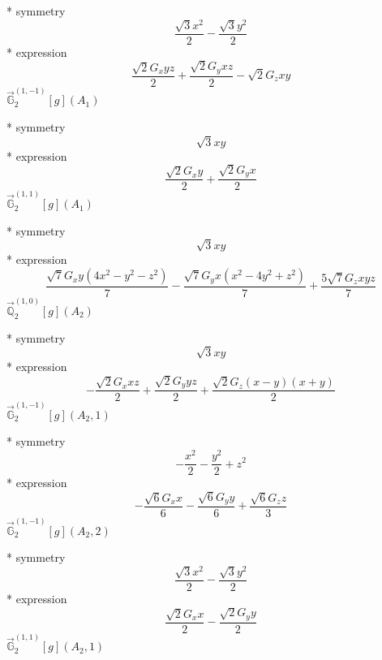 \documentclass[fleqn,8pt]{jsarticle}
\begin{document}
\noindent\quad ** symmetry
\begin{dmath*}
\frac{\sqrt{3} x^{2}}{2} - \frac{\sqrt{3} y^{2}}{2}
\end{dmath*}
\noindent\quad ** expression
\begin{dmath*}
\frac{\sqrt{2} G_{x} y z}{2} + \frac{\sqrt{2} G_{y} x z}{2} - \sqrt{2} G_{z} x y
\end{dmath*}
\noindent\quad $\vec{\mathbb{G}}_{2}^{(1,-1)}[g](A_{1})$

\noindent\quad ** symmetry
\begin{dmath*}
\sqrt{3} x y
\end{dmath*}
\noindent\quad ** expression
\begin{dmath*}
\frac{\sqrt{2} G_{x} y}{2} + \frac{\sqrt{2} G_{y} x}{2}
\end{dmath*}
\noindent\quad $\vec{\mathbb{G}}_{2}^{(1,1)}[g](A_{1})$

\noindent\quad ** symmetry
\begin{dmath*}
\sqrt{3} x y
\end{dmath*}
\noindent\quad ** expression
\begin{dmath*}
\frac{\sqrt{7} G_{x} y \left(4 x^{2} - y^{2} - z^{2}\right)}{7} - \frac{\sqrt{7} G_{y} x \left(x^{2} - 4 y^{2} + z^{2}\right)}{7} + \frac{5 \sqrt{7} G_{z} x y z}{7}
\end{dmath*}
\noindent\quad $\vec{\mathbb{Q}}_{2}^{(1,0)}[g](A_{2})$

\noindent\quad ** symmetry
\begin{dmath*}
\sqrt{3} x y
\end{dmath*}
\noindent\quad ** expression
\begin{dmath*}
- \frac{\sqrt{2} G_{x} x z}{2} + \frac{\sqrt{2} G_{y} y z}{2} + \frac{\sqrt{2} G_{z} \left(x - y\right) \left(x + y\right)}{2}
\end{dmath*}
\noindent\quad $\vec{\mathbb{G}}_{2}^{(1,-1)}[g](A_{2},1)$

\noindent\quad ** symmetry
\begin{dmath*}
- \frac{x^{2}}{2} - \frac{y^{2}}{2} + z^{2}
\end{dmath*}
\noindent\quad ** expression
\begin{dmath*}
- \frac{\sqrt{6} G_{x} x}{6} - \frac{\sqrt{6} G_{y} y}{6} + \frac{\sqrt{6} G_{z} z}{3}
\end{dmath*}
\noindent\quad $\vec{\mathbb{G}}_{2}^{(1,-1)}[g](A_{2},2)$

\noindent\quad ** symmetry
\begin{dmath*}
\frac{\sqrt{3} x^{2}}{2} - \frac{\sqrt{3} y^{2}}{2}
\end{dmath*}
\noindent\quad ** expression
\begin{dmath*}
\frac{\sqrt{2} G_{x} x}{2} - \frac{\sqrt{2} G_{y} y}{2}
\end{dmath*}
\noindent\quad $\vec{\mathbb{G}}_{2}^{(1,1)}[g](A_{2},1)$
\end{document}
